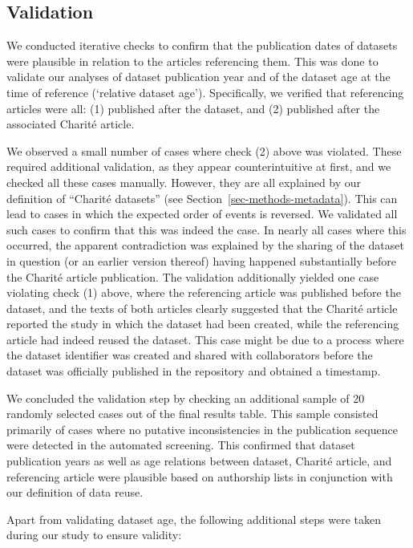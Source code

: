 \documentclass[
  letterpaper,
  DIV=11,
  numbers=noendperiod]{scrartcl}
\begin{document}
\subsection{Validation}\label{sec-methods-validation}

We conducted iterative checks to confirm that the publication dates of
datasets were plausible in relation to the articles referencing them.
This was done to validate our analyses of dataset publication year and
of the dataset age at the time of reference (`relative dataset age').
Specifically, we verified that referencing articles were all: (1)
published after the dataset, and (2) published after the associated
Charité article.

We observed a small number of cases where check (2) above was violated.
These required additional validation, as they appear counterintuitive at
first, and we checked all these cases manually. However, they are all
explained by our definition of ``Charité datasets'' (see
Section~\ref{sec-methods-metadata}). This can lead to cases in which the
expected order of events is reversed. We validated all such cases to
confirm that this was indeed the case. In nearly all cases where this
occurred, the apparent contradiction was explained by the sharing of the
dataset in question (or an earlier version thereof) having happened
substantially before the Charité article publication. The validation
additionally yielded one case violating check (1) above, where the
referencing article was published before the dataset, and the texts of
both articles clearly suggested that the Charité article reported the
study in which the dataset had been created, while the referencing
article had indeed reused the dataset. This case might be due to a
process where the dataset identifier was created and shared with
collaborators before the dataset was officially published in the
repository and obtained a timestamp.

We concluded the validation step by checking an additional sample of 20
randomly selected cases out of the final results table. This sample
consisted primarily of cases where no putative inconsistencies in the
publication sequence were detected in the automated screening. This
confirmed that dataset publication years as well as age relations
between dataset, Charité article, and referencing article were plausible
based on authorship lists in conjunction with our definition of data
reuse.

Apart from validating dataset age, the following additional steps were
taken during our study to ensure validity:
\end{document}
